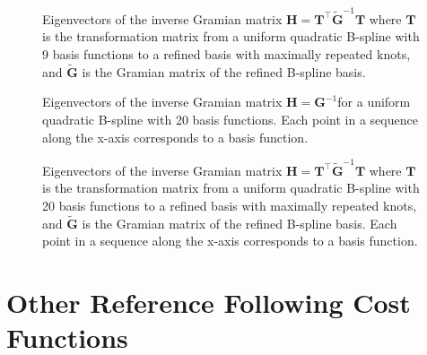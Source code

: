 \begin{figure}
    \centering
    
    \caption{Eigenvectors of the inverse Gramian matrix $\mathbf H = \mathbf T^\top \mathbf{\tilde G}^{-1} \mathbf T$ where $\mathbf T$ is the transformation matrix from a uniform quadratic B-spline with 9 basis functions to a refined basis with maximally repeated knots, and $\mathbf{\tilde G}$ is the Gramian matrix of the refined B-spline basis.}
    \label{fig:refined-basis-inverse-gramian-eigenvectors-9}
\end{figure}


\begin{figure}
    \centering
    
    \caption{Eigenvectors of the inverse Gramian matrix $\mathbf H = \mathbf{G}^{-1}$for a uniform quadratic B-spline with 20 basis functions. Each point in a sequence along the x-axis corresponds to a basis function.}
    \label{fig:basis-inverse-gramian-eigenvectors-20}
\end{figure}

\begin{figure}
    \centering
    
    \caption{Eigenvectors of the inverse Gramian matrix $\mathbf H = \mathbf T^\top \mathbf{\tilde G}^{-1} \mathbf T$ where $\mathbf T$ is the transformation matrix from a uniform quadratic B-spline with 20 basis functions to a refined basis with maximally repeated knots, and $\mathbf{\tilde G}$ is the Gramian matrix of the refined B-spline basis. Each point in a sequence along the x-axis corresponds to a basis function.}
    \label{fig:refined-basis-inverse-gramian-eigenvectors-20}
\end{figure}




\chapter{Other Reference Following Cost Functions}\label{app:failed-reference-following}

